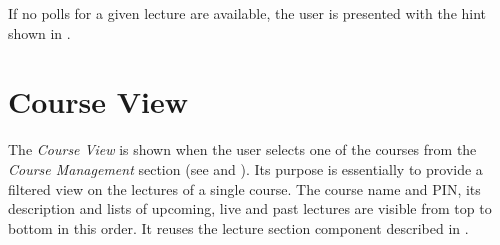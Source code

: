 If no polls for a given lecture are available, the user is presented with the hint shown in \todogrf.

\section{Course View}
\label{section:soa:courseview}

The \emph{Course View} is shown when the user selects one of the courses from the \emph{Course Management} section (see  and ). Its purpose is essentially to provide a filtered view on the lectures of a single course.
The course name and PIN, its description and lists of upcoming, live and past lectures are visible from top to bottom in this order. It reuses the lecture section component described in .


